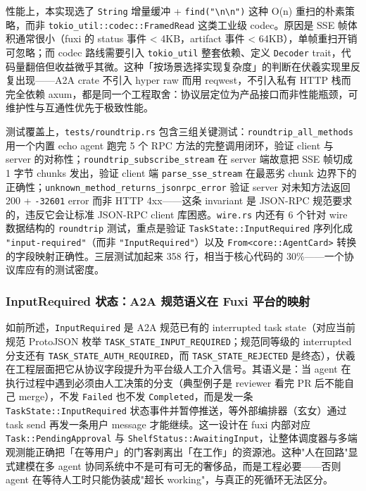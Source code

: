 性能上，本实现选了 \texttt{String} 增量缓冲 + \texttt{find("\textbackslash n\textbackslash n")} 这种 O(n) 重扫的朴素策略，而非 \texttt{tokio\_util::codec::FramedRead} 这类工业级 codec。原因是 SSE 帧体积通常很小（fuxi 的 status 事件 < 4KB，artifact 事件 < 64KB），单帧重扫开销可忽略；而 codec 路线需要引入 \texttt{tokio\_util} 整套依赖、定义 \texttt{Decoder} trait，代码量翻倍但收益微乎其微。这种「按场景选择实现复杂度」的判断在伏羲实现里反复出现——A2A crate 不引入 hyper raw 而用 reqwest，不引入私有 HTTP 栈而完全依赖 axum，都是同一个工程取舍：协议层定位为产品接口而非性能瓶颈，可维护性与互通性优先于极致性能。

测试覆盖上，\texttt{tests/roundtrip.rs} 包含三组关键测试：\texttt{roundtrip\_all\_methods} 用一个内置 echo agent 跑完 5 个 RPC 方法的完整调用闭环，验证 client 与 server 的对称性；\texttt{roundtrip\_subscribe\_stream} 在 server 端故意把 SSE 帧切成 1 字节 chunks 发出，验证 client 端 \texttt{parse\_sse\_stream} 在最恶劣 chunk 边界下的正确性；\texttt{unknown\_method\_returns\_jsonrpc\_error} 验证 server 对未知方法返回 200 + \texttt{-32601} error 而非 HTTP 4xx——这条 invariant 是 JSON-RPC 规范要求的，违反它会让标准 JSON-RPC client 库困惑。\texttt{wire.rs} 内还有 6 个针对 wire 数据结构的 \texttt{roundtrip} 测试，重点是验证 \texttt{TaskState::InputRequired} 序列化成 \texttt{"input-required"}（而非 \texttt{"InputRequired"}）以及 \texttt{From<core::AgentCard>} 转换的字段映射正确性。三层测试加起来 358 行，相当于核心代码的 30\%——一个协议库应有的测试密度。

\subsubsection{InputRequired 状态：A2A 规范语义在 Fuxi 平台的映射}

如前所述，\texttt{InputRequired} 是 A2A 规范已有的 interrupted task state（对应当前规范 ProtoJSON 枚举 \texttt{TASK\_STATE\_INPUT\_REQUIRED}；规范同等级的 interrupted 分支还有 \texttt{TASK\_STATE\_AUTH\_REQUIRED}，而 \texttt{TASK\_STATE\_REJECTED} 是终态），伏羲在工程层面把它从协议字段提升为平台级人工介入信号。其语义是：当 agent 在执行过程中遇到必须由人工决策的分支（典型例子是 reviewer 看完 PR 后不能自己 merge），不发 \texttt{Failed} 也不发 \texttt{Completed}，而是发一条 \texttt{TaskState::InputRequired} 状态事件并暂停推送，等外部编排器（玄女）通过 task send 再发一条用户 message 才能继续。这一设计在 fuxi 内部对应 \texttt{Task::PendingApproval} 与 \texttt{ShelfStatus::AwaitingInput}，让整体调度器与多端观测能正确把「在等用户」的门客剥离出「在工作」的资源池。这种"人在回路"显式建模在多 agent 协同系统中不是可有可无的奢侈品，而是工程必要——否则 agent 在等待人工时只能伪装成"超长 working"，与真正的死循环无法区分。

